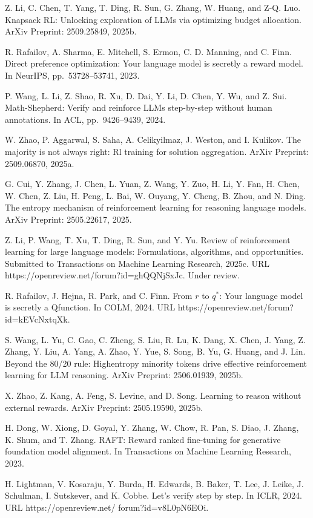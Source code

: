 \documentclass[
  10
]{article}
\begin{document}
Z. Li, C. Chen, T. Yang, T. Ding, R. Sun, G. Zhang, W. Huang, and Z-Q.
Luo. Knapsack RL: Unlocking exploration of LLMs via optimizing budget
allocation. ArXiv Preprint: 2509.25849, 2025b.

R. Rafailov, A. Sharma, E. Mitchell, S. Ermon, C. D. Manning, and C.
Finn. Direct preference optimization: Your language model is secretly a
reward model. In NeurIPS, pp.~53728--53741, 2023.

P. Wang, L. Li, Z. Shao, R. Xu, D. Dai, Y. Li, D. Chen, Y. Wu, and Z.
Sui. Math-Shepherd: Verify and reinforce LLMs step-by-step without human
annotations. In ACL, pp.~9426--9439, 2024.

W. Zhao, P. Aggarwal, S. Saha, A. Celikyilmaz, J. Weston, and I.
Kulikov. The majority is not always right: Rl training for solution
aggregation. ArXiv Preprint: 2509.06870, 2025a.

G. Cui, Y. Zhang, J. Chen, L. Yuan, Z. Wang, Y. Zuo, H. Li, Y. Fan, H.
Chen, W. Chen, Z. Liu, H. Peng, L. Bai, W. Ouyang, Y. Cheng, B. Zhou,
and N. Ding. The entropy mechanism of reinforcement learning for
reasoning language models. ArXiv Preprint: 2505.22617, 2025.

Z. Li, P. Wang, T. Xu, T. Ding, R. Sun, and Y. Yu. Review of
reinforcement learning for large language models: Formulations,
algorithms, and opportunities. Submitted to Transactions on Machine
Learning Research, 2025c. URL
https://openreview.net/forum?id=ghQQNjSxJc. Under review.

R. Rafailov, J. Hejna, R. Park, and C. Finn. From \(r\) to \(q^*\): Your
language model is secretly a Qfunction. In COLM, 2024. URL
https://openreview.net/forum?id=kEVcNxtqXk.

S. Wang, L. Yu, C. Gao, C. Zheng, S. Liu, R. Lu, K. Dang, X. Chen, J.
Yang, Z. Zhang, Y. Liu, A. Yang, A. Zhao, Y. Yue, S. Song, B. Yu, G.
Huang, and J. Lin. Beyond the 80/20 rule: Highentropy minority tokens
drive effective reinforcement learning for LLM reasoning. ArXiv
Preprint: 2506.01939, 2025b.

X. Zhao, Z. Kang, A. Feng, S. Levine, and D. Song. Learning to reason
without external rewards. ArXiv Preprint: 2505.19590, 2025b.

H. Dong, W. Xiong, D. Goyal, Y. Zhang, W. Chow, R. Pan, S. Diao, J.
Zhang, K. Shum, and T. Zhang. RAFT: Reward ranked fine-tuning for
generative foundation model alignment. In Transactions on Machine
Learning Research, 2023.

H. Lightman, V. Kosaraju, Y. Burda, H. Edwards, B. Baker, T. Lee, J.
Leike, J. Schulman, I. Sutskever, and K. Cobbe. Let's verify step by
step. In ICLR, 2024. URL https://openreview.net/ forum?id=v8L0pN6EOi.
\end{document}
